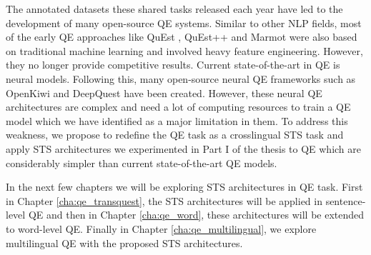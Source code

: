 The annotated datasets these shared tasks released each year have led to the development of many open-source QE systems. Similar to other NLP fields, most of the early QE approaches like QuEst \autocite{specia-etal-2013-quest}, QuEst++ \autocite{specia-etal-2015-multi} and Marmot \autocite{logacheva-etal-2016-marmot} were also based on traditional machine learning and involved heavy feature engineering. However, they no longer provide competitive results. Current state-of-the-art in QE is neural models. Following this, many open-source neural QE frameworks such as OpenKiwi \autocite{kepler-etal-2019-openkiwi} and DeepQuest \autocite{ive-etal-2018-deepquest} have been created. However, these neural QE architectures are complex and need a lot of computing resources to train a QE model which we have identified as a major limitation in them. To address this weakness, we propose to redefine the QE task as a crosslingual STS task and apply STS architectures we experimented in Part I of the thesis to QE which are considerably simpler than current state-of-the-art QE models.

In the next few chapters we will be exploring STS architectures in QE task. First in Chapter \ref{cha:qe_transquest}, the STS architectures will be applied in sentence-level QE and then in Chapter \ref{cha:qe_word}, these architectures will be extended to word-level QE. Finally in Chapter \ref{cha:qe_multilingual}, we explore multilingual QE with the proposed STS architectures.
